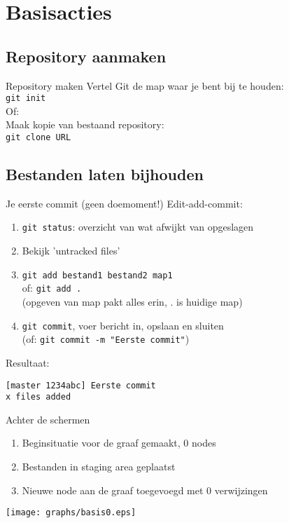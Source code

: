 \section{Basisacties}

\subsection{Repository aanmaken}
\begin{frame}[fragile]{Repository maken}
	Vertel Git de map waar je bent bij te houden:\\

	\texttt{git init}\\

	Of:\\

	Maak kopie van bestaand repository:\\

	\texttt{git clone URL}
\end{frame}

\subsection{Bestanden laten bijhouden}
\begin{frame}[fragile]{Je eerste commit (geen doemoment!)}
	Edit-add-commit:
	\begin{enumerate}
		\item \texttt{git status}: overzicht van wat afwijkt van opgeslagen
		\item Bekijk 'untracked files'
		\item \texttt{git add bestand1 bestand2 map1}\\ of:
			\texttt{git add .}\\
			(opgeven van map pakt alles erin, . is huidige map)
		\item \texttt{git commit}, voer bericht in, opslaan en sluiten\\
			(of: \texttt{git commit -m "Eerste commit"})
	\end{enumerate}
	Resultaat:
	\begin{verbatim}
[master 1234abc] Eerste commit
x files added
	\end{verbatim}
\end{frame}

\begin{frame}{Achter de schermen}
	\begin{enumerate}
		\item Beginsituatie voor de graaf gemaakt, 0 nodes
		\item Bestanden in staging area geplaatst
		\item Nieuwe node aan de graaf toegevoegd met 0 verwijzingen
	\end{enumerate}
	\begin{center}
		\texttt{[image: graphs/basis0.eps]}
	\end{center}
\end{frame}

